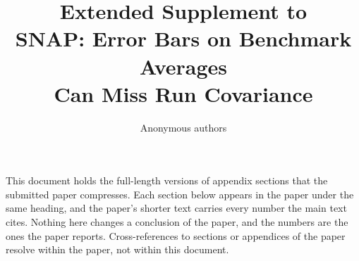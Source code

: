 \documentclass{article}
\title{Extended Supplement to\\SNAP: Error Bars on Benchmark Averages\\Can Miss Run Covariance}
\author{Anonymous authors}
\begin{document}
\maketitle
\noindent This document holds the full-length versions of appendix sections that the submitted paper compresses. Each section below appears in the paper under the same heading, and the paper's shorter text carries every number the main text cites. Nothing here changes a conclusion of the paper, and the numbers are the ones the paper reports. Cross-references to sections or appendices of the paper resolve within the paper, not within this document.
\appendix


\end{document}
